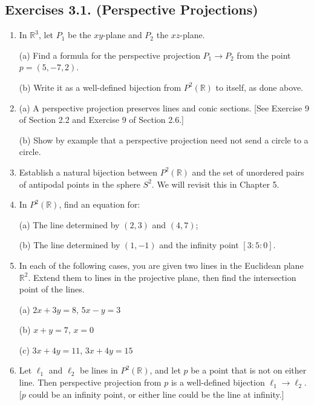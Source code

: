 \documentclass[leqno]{book}
\begin{document}
\subsection*{Exercises 3.1. (Perspective Projections)} %
\begin{enumerate}
\item In $\mathbb R^3$, let $P_1$ be the $xy$-plane and $P_2$ the $xz$-plane.

(a) Find a formula for the perspective projection $P_1\to P_2$ from the point $p=(5,-7,2)$.

(b) Write it as a well-defined bijection from $P^2(\mathbb R)$ to itself, as done above.

\item (a) A perspective projection preserves lines and conic sections.  [See Exercise 9 of Section 2.2 and Exercise 9 of Section 2.6.]

(b) Show by example that a perspective projection need not send a circle to a circle.

\item Establish a natural bijection between $P^2(\mathbb R)$ and the set of unordered pairs of antipodal points in the sphere $S^2$.  We will revisit this in Chapter 5.

\item In $P^2(\mathbb R)$, find an equation for:

(a) The line determined by $(2,3)$ and $(4,7)$;

(b) The line determined by $(1,-1)$ and the infinity point $[3:5:0]$.

\item In each of the following cases, you are given two lines in the Euclidean plane $\mathbb R^2$.  Extend them to lines in the projective plane, then find the intersection point of the lines.

(a) $2x+3y=8$, $5x-y=3$

(b) $x+y=7$, $x=0$

(c) $3x+4y=11$, $3x+4y=15$

\item Let $\ell_1$ and $\ell_2$ be lines in $P^2(\mathbb R)$, and let $p$ be a point that is not on either line.  Then perspective projection from $p$ is a well-defined bijection $\ell_1\to\ell_2$.  [$p$ could be an infinity point, or either line could be the line at infinity.]
\end{enumerate}
\end{document}
